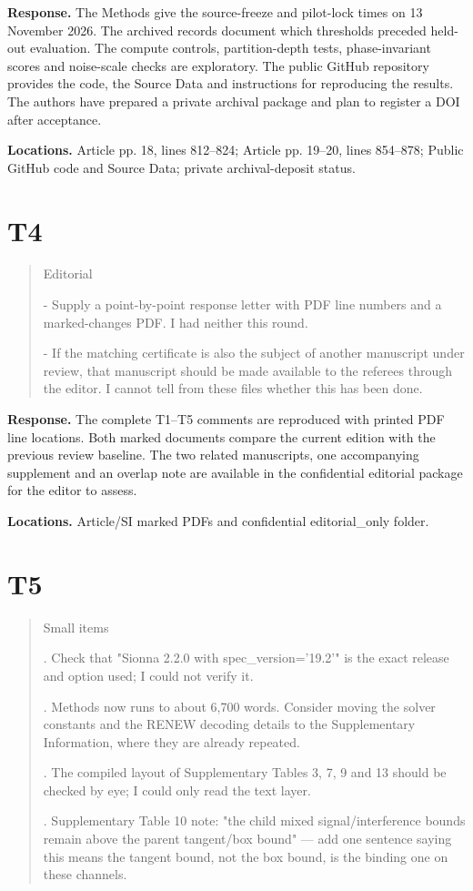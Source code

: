 \documentclass[10pt,letterpaper]{article}
\begin{document}
\textbf{Response.} The Methods give the source-freeze and pilot-lock times on 13 November 2026. The archived records document which thresholds preceded held-out evaluation. The compute controls, partition-depth tests, phase-invariant scores and noise-scale checks are exploratory. The public GitHub repository provides the code, the Source Data and instructions for reproducing the results. The authors have prepared a private archival package and plan to register a DOI after acceptance.

\textbf{Locations.} Article pp. 18, lines 812–824; Article pp. 19–20, lines 854–878; Public GitHub code and Source Data; private archival-deposit status.

\section*{T4}

\begin{quote}\small Editorial

\par\noindent - Supply a point-by-point response letter with PDF line numbers and a marked-changes PDF. I had neither this round.
\par\noindent - If the matching certificate is also the subject of another manuscript under review, that manuscript should be made available to the referees through the editor. I cannot tell from these files whether this has been done.\end{quote}

\textbf{Response.} The complete T1–T5 comments are reproduced with printed PDF line locations. Both marked documents compare the current edition with the previous review baseline. The two related manuscripts, one accompanying supplement and an overlap note are available in the confidential editorial package for the editor to assess.

\textbf{Locations.} Article/SI marked PDFs and confidential editorial\_only folder.

\section*{T5}

\begin{quote}\small Small items

\par{}. Check that "Sionna 2.2.0 with spec\_version='19.2'" is the exact release and option used; I could not verify it.
\par{}. Methods now runs to about 6,700 words. Consider moving the solver constants and the RENEW decoding details to the Supplementary Information, where they are already repeated.
\par{}. The compiled layout of Supplementary Tables 3, 7, 9 and 13 should be checked by eye; I could only read the text layer.
\par{}. Supplementary Table 10 note: "the child mixed signal/interference bounds remain above the parent tangent/box bound" — add one sentence saying this means the tangent bound, not the box bound, is the binding one on these channels.\end{quote}
\end{document}
